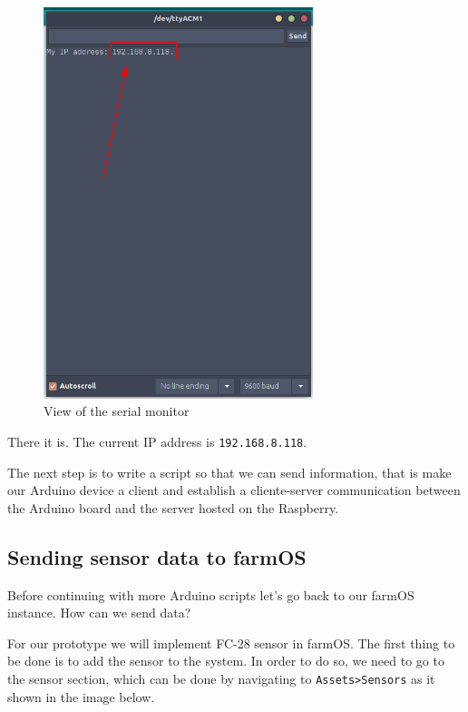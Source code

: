 \begin{figure}[H]
    \centering
    \includegraphics[width=0.7\textwidth]{fig/serial-monitor-ip.png}
    \caption{View of the serial monitor}
    \label{fig:serial-monitor-ip}
\end{figure}

There it is. The current IP address is \verb|192.168.8.118|.

The next step is to write a script so that we can send information, that is make our Arduino device a client and establish a cliente-server communication between the Arduino board and the server hosted on the Raspberry.

\vspace{7mm}
\subsection{Sending sensor data to farmOS}
Before continuing with more Arduino scripts let's go back to our farmOS instance. How can we send data?

For our prototype we will implement FC-28 sensor in farmOS. The first thing to be done is to add the sensor to the system. In order to do so, we need to go to the sensor section, which can be done by navigating to \verb|Assets>Sensors| as it shown in the image below.

